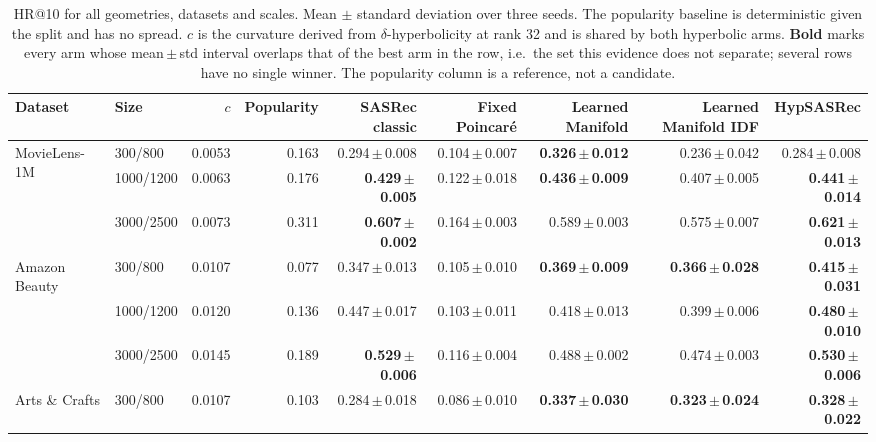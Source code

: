
\begin{table}[t]
\centering
\small
\setlength{\tabcolsep}{4pt}
\caption{HR@10 for all geometries, datasets and scales. Mean $\pm$ standard deviation over three seeds. The popularity baseline is deterministic given the split and has no spread. $c$ is the curvature derived from $\delta$-hyperbolicity at rank 32 and is shared by both hyperbolic arms. \textbf{Bold} marks every arm whose mean\,$\pm$\,std interval overlaps that of the best arm in the row, i.e.\ the set this evidence does not separate; several rows have no single winner. The popularity column is a reference, not a candidate.}
\label{tab:appendix-hr}
\begin{tabular}{llrrrrrrr}
\toprule
Dataset & Size & $c$ & Popularity & SASRec classic & Fixed Poincar\'e & Learned Manifold & Learned Manifold IDF & HypSASRec \\
\midrule
\multirow{3}{*}{MovieLens-1M} & 300/800 & 0.0053 & 0.163 & 0.294\,$\pm$\,0.008 & 0.104\,$\pm$\,0.007 & \textbf{0.326}\,$\pm$\,\textbf{0.012} & 0.236\,$\pm$\,0.042 & 0.284\,$\pm$\,0.008 \\
 & 1000/1200 & 0.0063 & 0.176 & \textbf{0.429}\,$\pm$\,\textbf{0.005} & 0.122\,$\pm$\,0.018 & \textbf{0.436}\,$\pm$\,\textbf{0.009} & 0.407\,$\pm$\,0.005 & \textbf{0.441}\,$\pm$\,\textbf{0.014} \\
 & 3000/2500 & 0.0073 & 0.311 & \textbf{0.607}\,$\pm$\,\textbf{0.002} & 0.164\,$\pm$\,0.003 & 0.589\,$\pm$\,0.003 & 0.575\,$\pm$\,0.007 & \textbf{0.621}\,$\pm$\,\textbf{0.013} \\
\midrule
\multirow{3}{*}{Amazon Beauty} & 300/800 & 0.0107 & 0.077 & 0.347\,$\pm$\,0.013 & 0.105\,$\pm$\,0.010 & \textbf{0.369}\,$\pm$\,\textbf{0.009} & \textbf{0.366}\,$\pm$\,\textbf{0.028} & \textbf{0.415}\,$\pm$\,\textbf{0.031} \\
 & 1000/1200 & 0.0120 & 0.136 & 0.447\,$\pm$\,0.017 & 0.103\,$\pm$\,0.011 & 0.418\,$\pm$\,0.013 & 0.399\,$\pm$\,0.006 & \textbf{0.480}\,$\pm$\,\textbf{0.010} \\
 & 3000/2500 & 0.0145 & 0.189 & \textbf{0.529}\,$\pm$\,\textbf{0.006} & 0.116\,$\pm$\,0.004 & 0.488\,$\pm$\,0.002 & 0.474\,$\pm$\,0.003 & \textbf{0.530}\,$\pm$\,\textbf{0.006} \\
\midrule
\multirow{3}{*}{Arts \& Crafts} & 300/800 & 0.0107 & 0.103 & 0.284\,$\pm$\,0.018 & 0.086\,$\pm$\,0.010 & \textbf{0.337}\,$\pm$\,\textbf{0.030} & \textbf{0.323}\,$\pm$\,\textbf{0.024} & \textbf{0.328}\,$\pm$\,\textbf{0.022} \\

\end{tabular}
\end{table}
